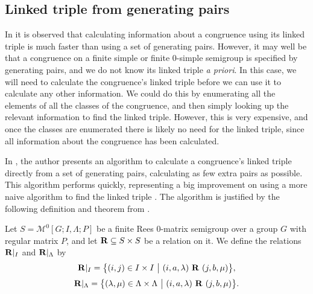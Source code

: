 \subsection{Linked triple from generating pairs}
\label{sec:pairs-to-linked-triple}

In \cite[\S 6.1]{mtorpey_pre_msc} it is observed that calculating information
about a congruence using its linked triple is much faster than using a set of
generating pairs.  However, it may well be that a congruence on a finite
simple or finite 0-simple semigroup is specified by generating pairs, and we do
not know its linked triple \textit{a priori}.  In this case, we will need to
calculate the congruence's linked triple before we can use it to calculate any
other information.  We could do this by enumerating all the elements of all the
classes of the congruence, and then simply looking up the relevant information
to find the linked triple.  However, this is very expensive, and once the
classes are enumerated there is likely no need for the linked triple, since all
information about the congruence has been calculated.

In \cite[\S 3.2]{mtorpey_msc}, the author presents an algorithm to calculate a
congruence's linked triple directly from a set of generating pairs, calculating
as few extra pairs as possible.  This algorithm performs quickly, representing a
big improvement on using a more naive algorithm to find the linked triple
\cite[\S 6.1.2]{mtorpey_msc}.  The algorithm is justified by the following
definition and theorem from \cite{mtorpey_msc}.

\begin{definition}
  \label{def:ri}
  Let $S = \mathcal{M}^0[G;I,\Lambda;P]$ be a finite Rees 0-matrix semigroup
  over a group $G$ with regular matrix $P$, and let $\mathbf{R} \subseteq S \times S$ be
  a relation on it.  We define the relations $\mathbf{R}|_I$ and $\mathbf{R}|_\Lambda$ by
  $$\mathbf{R}|_I = \big\{(i,j) \in I \times I ~\big|~
  (i,a,\lambda) ~\mathbf{R}~ (j,b,\mu)\big\},$$
  $$\mathbf{R}|_\Lambda = \big\{(\lambda,\mu) \in \Lambda \times \Lambda ~\big|~
  (i,a,\lambda) ~\mathbf{R}~ (j,b,\mu)\big\}.$$
\end{definition}

